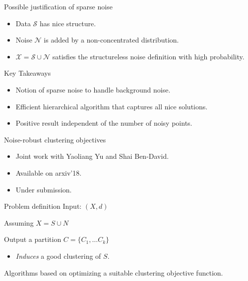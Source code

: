 \documentclass{beamer}
\newcommand{\mc}{\mathcal}
\begin{document}
\begin{frame}{Possible justification of sparse noise}
    \begin{itemize}
	  \item Data $\mc S$ has nice structure.
	  \vspace{20pt}\item Noise $\mc N$ is added by a non-concentrated distribution.
	  \vspace{30pt}\item $\mc X = \mc S \cup \mc N$ satisfies the structureless noise definition with high probability.
    \end{itemize}
\end{frame}

\begin{frame}{Key Takeaways}
	\begin{itemize}
		\item Notion of sparse noise to handle background noise.
		\vspace{25pt}\item Efficient hierarchical algorithm that captures {\color{blue}all nice} solutions.
		\vspace{25pt}\item Positive result {\color{blue}independent} of the number of noisy points.
	\end{itemize}
\end{frame}

\begin{frame}{Noise-robust clustering objectives}
	\begin{itemize}
		\item Joint work with Yaoliang Yu and Shai Ben-David.
		\vspace{25pt}\item Available on \alert{arxiv'18}. 
		\vspace{20pt}\item Under submission. 
	\end{itemize}
\end{frame}

\begin{frame}{Problem definition}
	Input: $(X, d)$
	\vspace{20pt}

	Assuming $X = S \cup N$

	\vspace{20pt}
	{\color{red} Output} a partition $C= \{C_1, \ldots C_k\}$
	\begin{itemize}
		\vspace{5pt}\item \emph{Induces} a good clustering of $S$. 
	\end{itemize}
	
	\vspace{20pt}Algorithms based on {\color{blue} optimizing} a {\color{blue} suitable clustering objective} function.
\end{frame}
\end{document}
